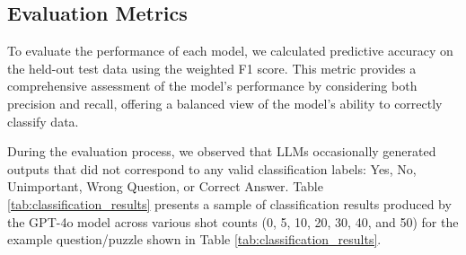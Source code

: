 \documentclass[conference]{IEEEtran}
\begin{document}
\subsection{Evaluation Metrics}

To evaluate the performance of each model, we calculated predictive accuracy on the held-out test data using the weighted F1 score. This metric provides a comprehensive assessment of the model’s performance by considering both precision and recall, offering a balanced view of the model's ability to correctly classify data.

During the evaluation process, we observed that LLMs occasionally generated outputs that did not correspond to any valid classification labels: Yes, No, Unimportant, Wrong Question, or Correct Answer. Table \ref{tab:classification_results} presents a sample of classification results produced by the GPT-4o model across various shot counts (0, 5, 10, 20, 30, 40, and 50) for the example question/puzzle shown in Table \ref{tab:classification_results}.
\end{document}
